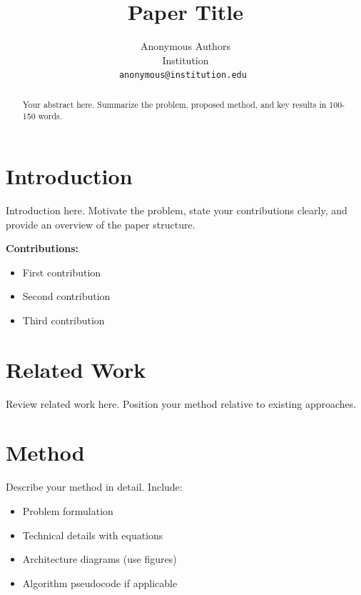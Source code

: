 \documentclass[10pt,twocolumn,letterpaper]{article}
\begin{document}
\title{Paper Title}

\author{
Anonymous Authors\\
Institution\\
\tt\small anonymous@institution.edu
}

\maketitle
\thispagestyle{empty}

\begin{abstract}
Your abstract here. Summarize the problem, proposed method, and key results in 100-150 words.
\end{abstract}

\section{Introduction}
\label{sec:intro}

Introduction here. Motivate the problem, state your contributions clearly, and provide an overview of the paper structure.

\textbf{Contributions:}
\begin{itemize}
    \item First contribution
    \item Second contribution
    \item Third contribution
\end{itemize}

\section{Related Work}
\label{sec:related}

Review related work here. Position your method relative to existing approaches.

\section{Method}
\label{sec:method}

Describe your method in detail. Include:
\begin{itemize}
    \item Problem formulation
    \item Technical details with equations
    \item Architecture diagrams (use figures)
    \item Algorithm pseudocode if applicable
\end{itemize}
\end{document}
